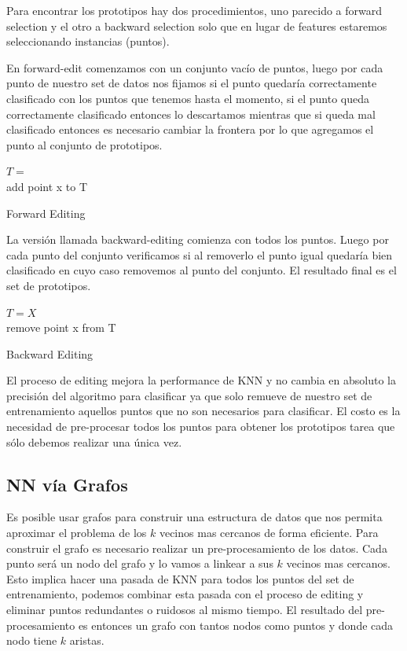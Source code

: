 Para encontrar los prototipos hay dos procedimientos, uno parecido a forward selection y el otro a backward selection solo que en lugar de features estaremos seleccionando instancias (puntos).

En forward-edit comenzamos con un conjunto vacío de puntos, luego por cada punto de nuestro set de datos nos fijamos si el punto quedaría correctamente clasificado con los puntos que tenemos hasta el momento, si el punto queda correctamente clasificado entonces lo descartamos mientras que si queda mal clasificado entonces es necesario cambiar la frontera por lo que agregamos el punto al conjunto de prototipos.

\begin{algorithm}[]
$T={}$ \\
 {
  {
    add point x to T\\
 }
}
\caption{Forward Editing}
\end{algorithm}

La versión llamada backward-editing comienza con todos los puntos. Luego por cada punto del conjunto verificamos si al removerlo el punto igual quedaría bien clasificado en cuyo caso removemos al punto del conjunto. El resultado final es el set de prototipos.

\begin{algorithm}[]
$T=X$ \\
 {
  {
    remove point x from T\\
 }
}
\caption{Backward Editing}
\end{algorithm}

El proceso de editing mejora la performance de KNN y no cambia en absoluto la precisión del algoritmo para clasificar ya que solo remueve de nuestro set de entrenamiento aquellos puntos que no son necesarios para clasificar. El costo es la necesidad de pre-procesar todos los puntos para obtener los prototipos tarea que sólo debemos realizar una única vez. 

\subsection{NN vía Grafos}

Es posible usar grafos para construir una estructura de datos que nos permita aproximar el problema de los $k$ vecinos mas cercanos de forma eficiente. Para construir el grafo es necesario realizar un pre-procesamiento de los datos. Cada punto será un nodo del grafo y lo vamos a linkear a sus $k$ vecinos mas cercanos. Esto implica hacer una pasada de KNN para todos los puntos del set de entrenamiento, podemos combinar esta pasada con el proceso de editing y eliminar puntos redundantes o ruidosos al mismo tiempo. El resultado del pre-procesamiento es entonces un grafo con tantos nodos como puntos y donde cada nodo tiene $k$ aristas.

